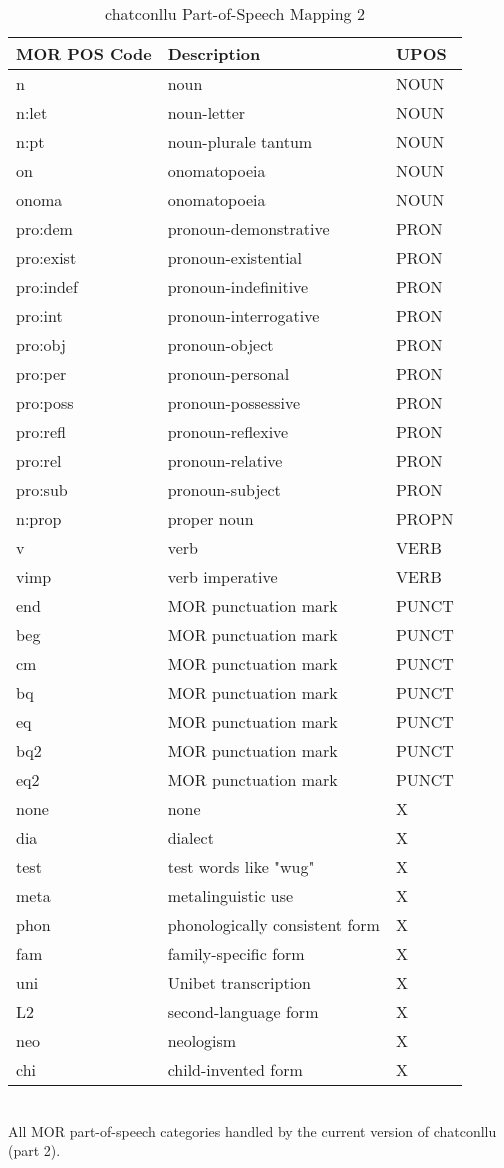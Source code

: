 \newpage
\vspace{-2cm}
\begin{table}
\caption {chatconllu Part-of-Speech Mapping 2} \label{tab:posmap2}
\centering
\begin{tabularx}{\linewidth}{@{}lXl@{}}
\toprule
\textbf{MOR POS Code} & \textbf{Description} & \textbf{UPOS}\\ \midrule
n & noun & NOUN\\
n:let & noun-letter & NOUN\\
n:pt & noun-plurale tantum & NOUN\\
on & onomatopoeia & NOUN\\
onoma & onomatopoeia & NOUN\\\midrule
pro:dem & pronoun-demonstrative & PRON\\
pro:exist & pronoun-existential & PRON\\
pro:indef & pronoun-indefinitive & PRON\\
pro:int & pronoun-interrogative & PRON\\
pro:obj & pronoun-object & PRON\\
pro:per & pronoun-personal & PRON\\
pro:poss & pronoun-possessive & PRON\\
pro:refl & pronoun-reflexive & PRON\\
pro:rel & pronoun-relative & PRON\\
pro:sub & pronoun-subject & PRON\\\midrule
n:prop & proper noun & PROPN\\\midrule
v & verb & VERB\\
vimp & verb imperative & VERB\\\midrule
end & MOR punctuation mark & PUNCT\\
beg & MOR punctuation mark & PUNCT\\
cm & MOR punctuation mark & PUNCT\\
bq & MOR punctuation mark & PUNCT\\
eq & MOR punctuation mark & PUNCT\\
bq2 & MOR punctuation mark & PUNCT\\
eq2 & MOR punctuation mark & PUNCT\\\midrule
none & none & X\\
dia & dialect & X\\
test & test words like "wug" & X\\
meta & metalinguistic use & X\\
phon & phonologically consistent form & X\\
fam & family-specific form & X\\
uni & Unibet transcription & X\\
L2 & second-language form & X\\
neo & neologism & X\\
chi & child-invented form & X\\\bottomrule
\end{tabularx}\\
\vspace{0.5cm}
All MOR part-of-speech categories handled by the current version of chatconllu (part 2).\\
\end{table}
\clearpage

